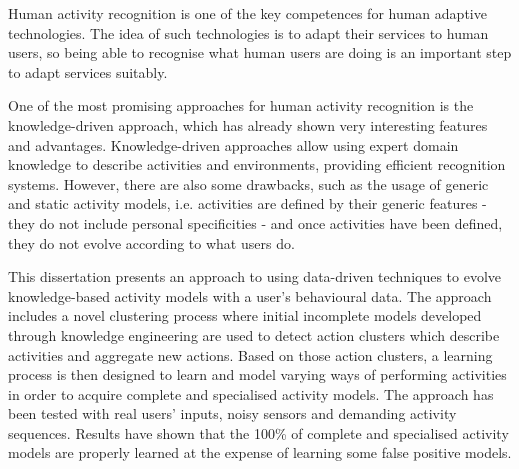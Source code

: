 




\begin{abstracts}        %

Human activity recognition is one of the key competences for human adaptive technologies. The idea of such technologies is to adapt their services to human users, so being able to recognise what human users are doing is an important step to adapt services suitably. 

One of the most promising approaches for human activity recognition is the knowledge-driven approach, which has already shown very interesting features and advantages. Knowledge-driven approaches allow using expert domain knowledge to describe activities and environments, providing efficient recognition systems. However, there are also some drawbacks, such as the usage of generic and static activity models, i.e. activities are defined by their generic features - they do not include personal specificities - and once activities have been defined, they do not evolve according to what users do.

This dissertation presents an approach to using data-driven techniques to evolve knowledge-based activity models with a user's behavioural data. The approach includes a novel clustering process where initial incomplete models developed through knowledge engineering are used to detect action clusters which describe activities and aggregate new actions. Based on those action clusters, a learning process is then designed to learn and model varying ways of performing activities in order to acquire complete and specialised activity models. The approach has been tested with real users' inputs, noisy sensors and demanding activity sequences. Results have shown that the 100\% of complete and specialised activity models are properly learned at the expense of learning some false positive models.

\end{abstracts}

